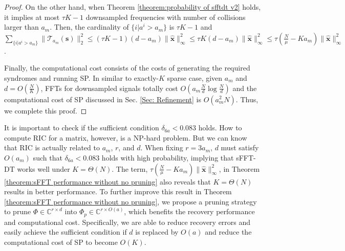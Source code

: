 \documentclass[journal,onecolumn,11pt]{IEEEtran}
\begin{document}
\begin{proof}
On the other hand, when Theorem \ref{theorem:probability of sfftdt v2} holds, it implies at most $\tau K -1$ downsampled frequencies with number of collisions larger than $a_m$.
Then, the cardinality of $\{i | a^{i} > a_m\}$ is $\tau K -1$ and $\sum_{ \{i | a^{i} > a_m\} } \| \mathcal{T}_{a_{m}}(\bm{s}) \|_2^2 \leq   (\tau K -1)(d-a_{m})\| \bm{\hat{x}} \|_\infty^2 \leq   \tau K(d-a_{m})\| \bm{\hat{x}} \|_\infty^2 \leq   \tau(\frac{N}{\mu}-Ka_{m})\| \bm{\hat{x}} \|_\infty^2$.

Finally, the computational cost consists of the costs of generating the required syndromes and running SP.
In similar to exactly-$K$ sparse case, given $a_{m}$ and $d=O(\frac{N}{K})$, FFTs for downsampled signals totally cost $O(a_{m} \frac{N}{d} \log \frac{N}{d})$ and the computational cost of SP discussed in Sec. \ref{Sec: Refinement} is $O(a_{m}^2 N)$.
Thus, we complete this proof.
\end{proof}

It is important to check if the sufficient condition $\delta_{6a}<0.083$ holds.
How to compute RIC for a matrix, however, is a NP-hard problem.
But we can know that RIC is actually related to $a_{m}$, $r$, and $d$.
When fixing $r = 3a_{m}$, $d$ must satisfy $O(a_{m})$ such that $\delta_{6a}<0.083$ holds with high probability, implying that sFFT-DT works well under $K=\Theta(N)$.
The term, $\tau(   \frac{N}{\mu} -Ka_{m})\|  \bm{\hat{x}}  \|_\infty^{2}$, in Theorem \ref{theorem:sFFT performance without no pruning} also reveals that $K=\Theta(N)$ results in better performance.
To further improve this result in Theorem \ref{theorem:sFFT performance without no pruning}, we propose a pruning strategy to prune $\Phi \in \mathbb{C}^{r \times d}$ into $\Phi_{p} \in \mathbb{C}^{r \times O(a)}$, which benefits the recovery performance and computational cost.
Specifically, we are able to reduce recovery errors and easily achieve the sufficient condition if $d$ is replaced by $O(a)$ and reduce the computational cost of SP to become $O(K)$.
\end{document}
